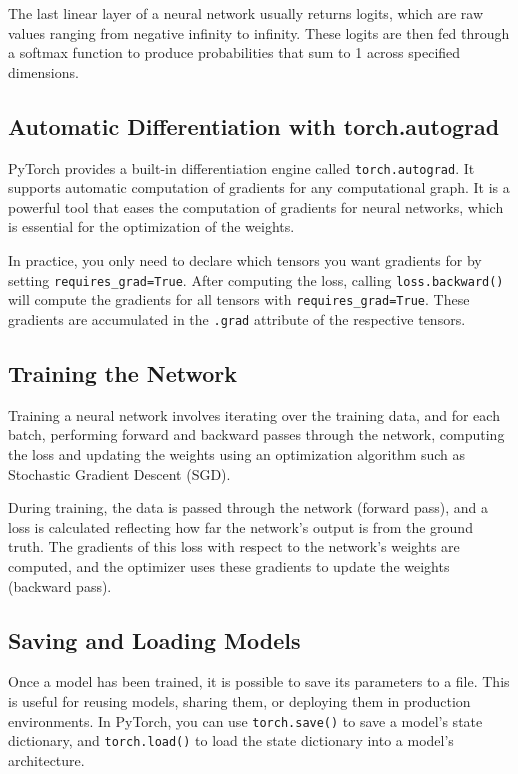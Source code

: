 The last linear layer of a neural network usually returns logits, which are raw values ranging from negative infinity to infinity. These logits are then fed through a softmax function to produce probabilities that sum to 1 across specified dimensions.

\subsection{Automatic Differentiation with torch.autograd}

PyTorch provides a built-in differentiation engine called \verb|torch.autograd|. It supports automatic computation of gradients for any computational graph. It is a powerful tool that eases the computation of gradients for neural networks, which is essential for the optimization of the weights.

In practice, you only need to declare which tensors you want gradients for by setting \verb|requires_grad=True|. After computing the loss, calling \verb|loss.backward()| will compute the gradients for all tensors with \verb|requires_grad=True|. These gradients are accumulated in the \verb|.grad| attribute of the respective tensors.

\subsection{Training the Network}

Training a neural network involves iterating over the training data, and for each batch, performing forward and backward passes through the network, computing the loss and updating the weights using an optimization algorithm such as Stochastic Gradient Descent (SGD).

During training, the data is passed through the network (forward pass), and a loss is calculated reflecting how far the network's output is from the ground truth. The gradients of this loss with respect to the network's weights are computed, and the optimizer uses these gradients to update the weights (backward pass).

\subsection{Saving and Loading Models}

Once a model has been trained, it is possible to save its parameters to a file. This is useful for reusing models, sharing them, or deploying them in production environments. In PyTorch, you can use \verb|torch.save()| to save a model's state dictionary, and \verb|torch.load()| to load the state dictionary into a model's architecture.

